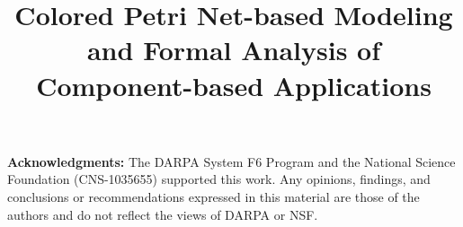 \documentclass[10pt,conference]{IEEEtran}
\begin{document}
\title{ Colored Petri Net-based Modeling and Formal Analysis of Component-based Applications }
\vspace{-0.1in}
\author{ 
}


\setcounter{page}{1}
\maketitle










\textbf{Acknowledgments:} The DARPA System F6 Program and the National
Science Foundation (CNS-1035655) supported
this work. Any opinions, findings, and conclusions or recommendations expressed
in this material are those of the authors and do not reflect the views of
DARPA or NSF. 


\balance
\begin{spacing}{0.88}


\end{spacing}
\end{document}
